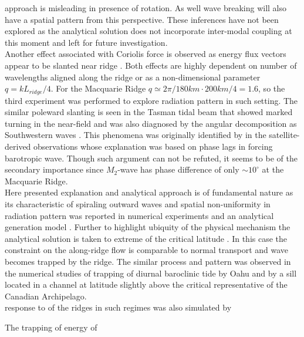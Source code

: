 \documentclass[12pt]{article}
\begin{document}
approach \citep[e.g.][]{st2003generation} is misleading in presence of rotation. As well wave 
breaking will also have a spatial pattern \citep{buhler2007instability} from this perspective. 
These inferences have not been explored as the analytical solution does not incorporate 
inter-modal coupling at this moment and left for future investigation.\\
Another effect associated with Coriolis force is observed as energy flux vectors appear to be 
slanted near ridge . Both effects are highly dependent on number 
of wavelengths aligned along the ridge or as a non-dimensional parameter $q = k 
L_{ridge}/4$. For the Macquarie Ridge $q \simeq 2\pi/180km \cdot 200km/4 = 1.6$, so the third 
experiment was performed to explore radiation pattern in such setting. The similar poleward 
slanting is seen in the Tasman tidal beam that showed marked turning in the near-field 
 and was also diagnosed by the angular decomposition as Southwestern 
waves . This phenomena was originally identified by 
\citep{zhao2018satellite} in the satellite-derived observations whose explanation was based 
on phase lags in forcing barotropic wave. Though such argument can not be refuted, it seems to be 
of the secondary importance since $M_2$-wave has phase difference of only $\sim 10^{\circ}$ 
 at the Macquarie Ridge.\\
Here presented explanation and analytical approach is of fundamental nature as its characteristic 
of spiraling outward waves and spatial non-uniformity in radiation pattern was reported in 
numerical experiments \citep{munroe2005topographic} and an analytical generation model 
\citep{baines2007internal}. Further to highlight ubiquity of the physical mechanism the analytical 
solution is taken to extreme of the critical latitude . In this 
case the constraint on the along-ridge flow is comparable to normal transport and wave becomes 
trapped by the ridge. The similar process and pattern was observed in the numerical studies of 
trapping of diurnal baroclinic tide by Oahu \citep{smith2017coastal} and by a sill located in a 
channel at latitude slightly above the critical \citep{hughes2018tidal} representative of the 
Canadian Archipelago.\\
 
response to  of 
the 
ridges in such regimes was also simulated by 

 The trapping of 
energy 
of 
\end{document}
